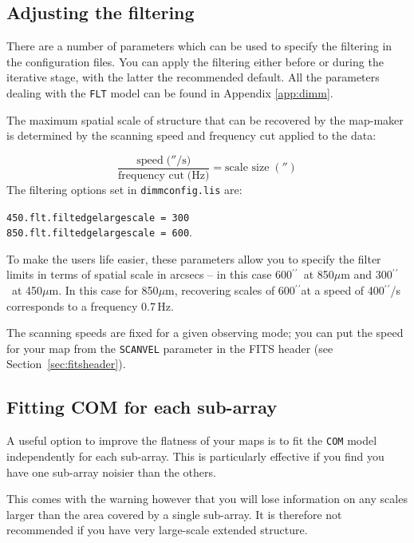 \documentclass[twoside,11pt]{article}
\newcommand{\xlabel}[1]{}
\renewcommand{\_}{\texttt{\symbol{95}}}
\newcommand{\arcmin}{\mbox{$^\prime$}}
\newcommand{\arcsec}{\arcmin\hspace*{-0.1em}\arcmin}
\begin{document}
\subsection{\xlabel{filter}Adjusting the filtering}
\label{sec:filt}

There are a number of parameters which can be used to specify the
filtering in the configuration files. You can apply the filtering
either before or during the iterative stage, with the latter the
recommended default. All the parameters dealing with the \texttt{FLT}
model can be found in Appendix \ref{app:dimm}.

The maximum spatial scale of structure that can be recovered by the
map-maker is determined by the scanning speed and frequency cut
applied to the data:

\begin{equation}
\frac{\mbox{speed}\;(''/\mbox{s)}}{\mbox{frequency cut}\;(\mbox{Hz)}}=\mbox{scale size}\;('')
\end{equation}
The filtering options set in \texttt{dimmconfig.lis} are:

\texttt{450.flt.filt\_edge\_largescale = 300} \\
\texttt{850.flt.filt\_edge\_largescale = 600}.

To make the users life easier, these parameters allow you to specify
the filter limits in terms of spatial scale in arcsecs -- in this case
600\arcsec\ at 850$\mu$m and 300\arcsec\ at 450$\mu$m. In this case for
850$\mu$m, recovering scales of 600\arcsec at a speed of 400\arcsec/s
corresponds to a frequency 0.7\,Hz.

The scanning speeds are fixed for a given observing mode; you can put
the speed for your map from the \texttt{SCAN\_VEL} parameter in the
FITS header (see Section~\ref{sec:fitsheader}).


\subsection{\xlabel{filter}Fitting COM for each sub-array}
\label{sec:com}

A useful option to improve the flatness of your maps is to fit the
\texttt{COM} model independently for each sub-array. This is
particularly effective if you find you have one sub-array noisier than
the others.

This comes with the warning however that you will lose information on
any scales larger than the area covered by a single sub-array. It is
therefore not recommended if you have very large-scale extended
structure.
\end{document}
